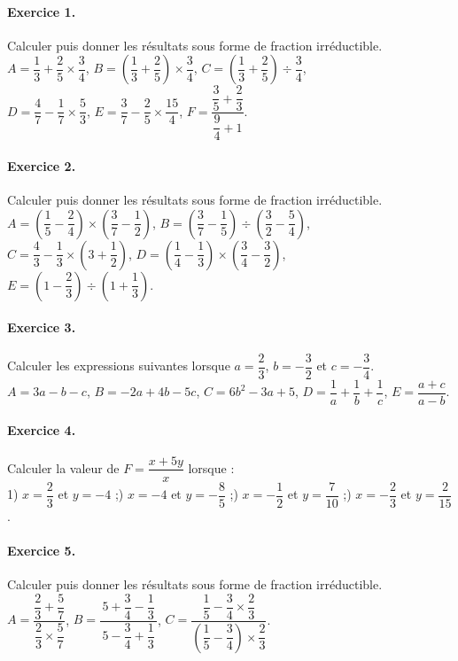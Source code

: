 \documentclass[12pt]{article}
\newenvironment{exercice}[1]{\paragraph{Exercice #1.}}{}
\begin{document}
\begin{exercice}{1}
Calculer puis donner les résultats sous forme de fraction irréductible.\\
$A=\dfrac{1}{3}+\dfrac{2}{5}\times\dfrac{3}{4}$,\quad
$B=\left(\dfrac{1}{3}+\dfrac{2}{5}\right)\times\dfrac{3}{4}$,\quad
$C=\left(\dfrac{1}{3}+\dfrac{2}{5}\right)\div\dfrac{3}{4}$,\\
$D=\dfrac{4}{7}-\dfrac{1}{7}\times\dfrac{5}{3}$,\quad
$E=\dfrac{3}{7}-\dfrac{2}{5}\times\dfrac{15}{4}$,\quad
$F=\dfrac{\dfrac{3}{5}+\dfrac{2}{3}}{\dfrac{9}{4}+1}$. 
\end{exercice}

\begin{exercice}{2}
Calculer puis donner les résultats sous forme de fraction irréductible.\\
$A=\left(\dfrac{1}{5}-\dfrac{2}{4}\right)\times\left(\dfrac{3}{7}-\dfrac{1}{2}\right)$,\quad
$B=\left(\dfrac{3}{7}-\dfrac{1}{5}\right)\div\left(\dfrac{3}{2}-\dfrac{5}{4}\right)$,\\
$C=\dfrac{4}{3}-\dfrac{1}{3}\times\left(3+\dfrac{1}{2}\right)$,\quad
$D=\left(\dfrac{1}{4}-\dfrac{1}{3}\right)\times\left(\dfrac{3}{4}-\dfrac{3}{2}\right)$,\\
$E=\left(1-\dfrac{2}{3}\right)\div\left(1+\dfrac{1}{3}\right)$.
\end{exercice} 

\begin{exercice}{3}
Calculer les expressions suivantes lorsque $a=\dfrac{2}{3}$, $b=-\dfrac{3}{2}$ et $c=-\dfrac{3}{4}$.\\
$A=3a-b-c$,\quad
$B=-2a+4b-5c$,\quad
$C=6b^{2}-3a+5$,\quad
$D=\dfrac{1}{a}+\dfrac{1}{b}+\dfrac{1}{c}$,\quad
$E=\dfrac{a+c}{a-b}$.
\end{exercice} 

\begin{exercice}{4}
Calculer la valeur de $F=\dfrac{x+5y}{x}$ lorsque :\\
1) $x=\dfrac{2}{3}$ et $y=-4$ ;) $x=-4$ et $y=-\dfrac{8}{5}$ ;) $x=-\dfrac{1}{2}$ et $y=\dfrac{7}{10}$ ;) $x=-\dfrac{2}{3}$ et $y=\dfrac{2}{15}$.
\end{exercice} 

\begin{exercice}{5}
Calculer puis donner les résultats sous forme de fraction irréductible.\\
$A=\dfrac{\dfrac{2}{3}+\dfrac{5}{7}}{\dfrac{2}{3}\times\dfrac{5}{7}}$,\quad
$B=\dfrac{5+\dfrac{3}{4}-\dfrac{1}{3}}{\,5-\dfrac{3}{4}+\dfrac{1}{3}\,}$,\quad
$C=\dfrac{\dfrac{1}{5}-\dfrac{3}{4}\times\dfrac{2}{3}}{\left(\dfrac{1}{5}-\dfrac{3}{4}\right)\times\dfrac{2}{3}}$.
\end{exercice}
\end{document}
